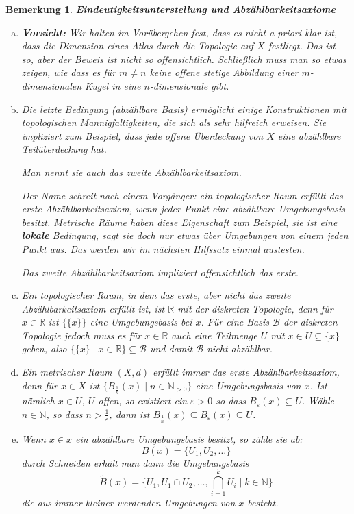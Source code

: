 \documentclass[12pt]{scrbook}   %
\newtheorem{bemX}[alles]{Bemerkung}
\newenvironment{bem}[1]{\begin{bemX}{\bf #1}\par\rm}{\end{bemX}}
\begin{document}
\begin{bem}{Eindeutigkeitsunterstellung und Abzählbarkeitsaxiome}
\begin{enumerate}[a)]
\item 
{\bf Vorsicht:} Wir halten im Vorübergehen fest, dass es nicht {\it a
priori} klar ist, dass die Dimension eines Atlas durch die Topologie auf $X$
festliegt. Das ist so, aber der Beweis ist nicht so offensichtlich.
Schließlich muss man so etwas zeigen, wie dass es für $m\neq n$ keine 
offene stetige Abbildung einer $m$-dimensionalen Kugel in eine 
$n$-dimensionale gibt.

\item
Die letzte Bedingung (abzählbare Basis) ermöglicht einige Konstruktionen mit topologischen 
Mannigfaltigkeiten, die sich als sehr hilfreich erweisen. 
Sie impliziert zum Beispiel, dass jede offene Überdeckung von $X$ eine
abzählbare Teilüberdeckung hat. 

Man nennt sie auch das {\it zweite Abzählbarkeitsaxiom}.


Der Name schreit nach einem Vorgänger: ein topologischer Raum erfüllt das 
{\it erste Abzählbarkeitsaxiom}, wenn jeder Punkt eine abzählbare 
Umgebungsbasis besitzt. Metrische Räume haben diese Eigenschaft zum Beispiel,
sie ist eine {\bf lokale} Bedingung, sagt sie doch nur etwas über Umgebungen 
von einem jeden Punkt aus. Das werden wir im nächsten Hilfssatz einmal
austesten.

Das zweite Abzählbarkeitsaxiom impliziert offensichtlich das erste.

\item Ein topologischer Raum, in dem das erste, aber nicht das zweite Abzählbarkeitsaxiom erfüllt ist, ist $\mathbb R$ mit der diskreten Topologie, denn für $x\in \mathbb R$ ist $\{\{x\}\}$ eine Umgebungsbasis bei $x$. Für eine Basis $\mathcal B$ der diskreten Topologie jedoch muss es für $x\in \mathbb R$ auch eine Teilmenge $U$ mit $x\in U\subseteq\{x\}$ geben, also $\{\{x\}\mid x\in \mathbb R\}\subseteq \mathcal B$ und damit $\mathcal B$ nicht abzählbar.

\item Ein metrischer Raum $(X,d)$ erfüllt immer das erste Abzählbarkeitsaxiom, denn für $x\in X$ ist $\{B_{\frac1n}(x)\mid n\in \mathbb N_{>0}\}$ eine Umgebungsbasis von $x$. Ist nämlich $x\in U$, $U$ offen, so existiert ein $\varepsilon >0$ so dass $B_\varepsilon(x)\subseteq U$. Wähle $n\in \mathbb N$, so dass $n>\frac1\varepsilon$, dann ist $B_{\frac1n}(x)\subseteq B_\varepsilon(x)\subseteq U$.

\item Wenn $x\in x$ ein abzählbare Umgebungsbasis besitzt, so zähle sie ab:
\[
B(x) = \{U_1,U_2,\ldots\}
\]
durch Schneiden erhält man dann die Umgebungsbasis
\[
\tilde B(x) = \{U_1,U_1\cap U_2,\ldots,\bigcap_{i=1}^kU_i \mid k\in\mathbb N\}
\]
die aus immer kleiner werdenden Umgebungen von $x$ besteht.


\end{enumerate}
\end{bem}
\end{document}
